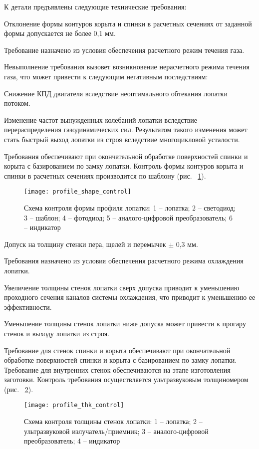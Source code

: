 К детали предъявлены следующие технические требования:

Отклонение формы контуров корыта и спинки в расчетных сечениях от заданной формы допускается не более 0,1 мм.

Требование назначено из условия обеспечения расчетного режим течения газа.

Невыполнение требования вызовет возникновение нерасчетного режима течения газа, что может привести к следующим негативным последствиям:

Снижение КПД двигателя вследствие неоптимального обтекания лопатки потоком.

Изменение частот вынужденных колебаний лопатки вследствие перераспределения газодинамических сил. Результатом такого изменения может стать быстрый выход лопатки из строя вследствие многоцикловой усталости.

Требования обеспечивают при окончательной обработке поверхностей спинки и корыта с базированием по замку лопатки.
Контроль формы контуров корыта и спинки в расчетных сечениях производится по шаблону (рис. ~\ref{img:profile_shape_control}).

\begin{figure}[H]
	\centering
	\texttt{[image: profile\_shape\_control]}
	\caption{Схема контроля формы профиля лопатки: 1 – лопатка; 2 – светодиод; 3 – шаблон; 4 – фотодиод; 5 –
	аналого-цифровой преобразователь; 6 – индикатор}
	\label{img:profile_shape_control}
\end{figure}

Допуск на  толщину стенки пера, щелей и перемычек $\pm$ 0,3 мм.

Требования назначено из условия обеспечения расчетного режима охлаждения лопатки.

Увеличение толщины стенок лопатки сверх допуска приводит к уменьшению проходного сечения каналов системы охлаждения, что приводит к уменьшению ее эффективности.

Уменьшение толщины стенок лопатки ниже допуска может привести к прогару стенок и выходу лопатки из строя.

Требование для стенок спинки и корыта обеспечивают при окончательной обработке поверхностей спинки и корыта с базированием по замку лопатки. Требование для внутренних стенок обеспечиваются на этапе изготовления заготовки.
Контроль требования осуществляется ультразвуковым толщиномером (рис. ~\ref{img:profile_thk_control}).

\begin{figure}[H]
	\centering
	\texttt{[image: profile\_thk\_control]}
	\caption{Схема контроля толщины стенок лопатки: 1 – лопатка; 2 – ультразвуковой излучатель/приемник; 3 –
	аналого-цифровой преобразователь; 4 – индикатор}
	\label{img:profile_thk_control}
\end{figure}

